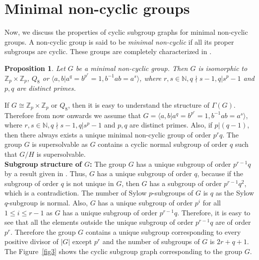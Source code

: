 \documentclass[11pt,twoside]{amsart}
\def \N {{\mathbb{N}}}
\def \Z {{\mathbb{Z}}}
\def \Ga {{\Gamma }}
\newtheorem{pro}[theorem]{Proposition}
\begin{document}
   \section{Minimal non-cyclic groups}\label{sec:3}
   Now, we discuss the properties of cyclic subgroup graphs for minimal non-cyclic groups. A non-cyclic group is said to be {\em minimal non-cyclic} if all its proper subgroups are cyclic. These groups are completely characterized in \cite[Proposition~2.8]{jafari2017number}.
\begin{pro}\cite[Proposition~2.8]{jafari2017number}
    Let $G$ be a minimal non-cyclic group. Then $G$ is isomorphic to $\Z_p\times \Z_p$, $Q_8$ or $\langle a,b|a^q=b^{p^r}=1, b^{-1}ab=a^s\rangle$, where $r,s\in \N,q\nmid{s-1}, q|{s^p-1}$ and $p,q$ are distinct primes.
   \end{pro}
   \noindent If $G\cong {\Z_p\times \Z_p}$ or $Q_8$, then it is easy to understand the structure of $\Ga (G)$. Therefore from now onwards we assume that $G=\langle a,b|a^q=b^{p^r}=1, b^{-1}ab=a^s\rangle$, where $r,s\in \N,q\nmid{s-1}, q|{s^p-1}$ and $p,q$ are distinct primes. Also, if $p| (q-1)$, then there always exists a unique minimal non-cyclic group of order $p^rq$. The group $G$ is supersolvable as $G$ contains a cyclic normal subgroup of order $q$ such that $G/H$ is supersolvable.\\
   
   \textbf{Subgroup structure of $G$:}
   The group $G$ has a unique subgroup of order $p^{r-1}q$ by a result given in \cite[Page No.~33]{taunt_1949}. Thus, $G$ has a unique subgroup of order $q$, because if the subgroup of order $q$ is not unique in $G$, then $G$ has a subgroup of order $p^{r-1}q^2$, which is a contradiction. The number of Sylow $p$-subgroups of $G$ is $q$ as the Sylow $q$-subgroup is normal. Also, $G$ has a unique subgroup of order $p^i$ for all $1\leq i \leq{r-1}$  as $G$ has a unique subgroup of order $p^{r-1}q$. Therefore, it is easy to see that all the elements outside the unique subgroup of order $p^{r-1}q$ are of order $p^r$. Therefore the group $G$ contains a unique subgroup corresponding to every positive divisor of $|G|$ except $p^r$ and
 the number of subgroups of $G$ is $2r+q+1$.\\
 
   \noindent The Figure~\ref{fig3} shows the cyclic subgroup graph corresponding to the group $G$.
\end{document}
